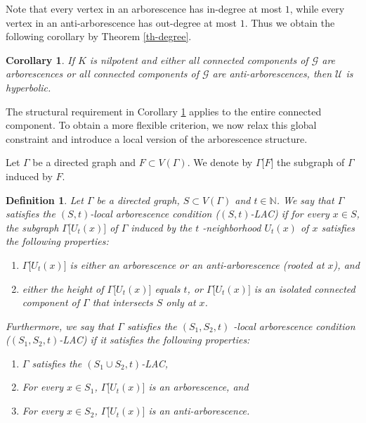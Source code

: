 \documentclass[reqno]{amsart}
\theoremstyle{plain}
\newtheorem{corollary}{Corollary}
\newtheorem{definition}{Definition}
\numberwithin{equation}{section}
\begin{document}
Note that every vertex in an arborescence has in-degree at most $1$, while
every vertex in an anti-arborescence has out-degree at most $1$. Thus we
obtain the following corollary by Theorem \ref{th-degree}.

\begin{corollary}
\label{cor-arbo}If $K$ is nilpotent and either all connected components of $%
\mathcal{G}$ are arborescences or all connected components of $\mathcal{G}$
are anti-arborescences, then $\mathcal{U}$ is hyperbolic.
\end{corollary}

The structural requirement in Corollary \ref{cor-arbo} applies to the entire
connected component. To obtain a more flexible criterion, we now relax this
global constraint and introduce a local version of the arborescence
structure.

Let $\Gamma $ be a directed graph and $F\subset V(\Gamma ).$ We denote by $%
\Gamma \lbrack F]$ the subgraph of $\Gamma $ induced by $F$.

\begin{definition}
\label{LAC}Let $\Gamma $ be a directed graph, $S\subset V(\Gamma )$ and $%
t\in \mathbb{N}$. We say that $\Gamma $ satisfies the $(S,t)$\emph{-local
arborescence condition (}$(S,t)$-LAC\emph{)} if for every $x\in S$, the
subgraph $\Gamma \lbrack U_{t}(x)]$ of $\Gamma $ induced by the $t$%
-neighborhood $U_{t}(x)$ of $x$ satisfies the following properties:

\begin{enumerate}
\item[(i)] $\Gamma \lbrack U_{t}(x)]$ is either an arborescence or an
anti-arborescence (rooted at $x$), and

\item[(ii)] either the height of $\Gamma \lbrack U_{t}(x)]$ equals $t$, or $%
\Gamma \lbrack U_{t}(x)]$ is an isolated connected component of $\Gamma $
that intersects $S$ only at $x$.
\end{enumerate}

Furthermore, we say that $\Gamma $ satisfies the $(S_{1},S_{2},t)$\emph{%
-local arborescence condition }($(S_{1},S_{2},t)$-LAC) if it satisfies the
following properties:

\begin{enumerate}
\item[(i)] $\Gamma $ satisfies the $(S_{1}\cup S_{2},t)$-LAC,

\item[(ii)] For every $x\in S_{1}$, $\Gamma \lbrack U_{t}(x)]$ is an
arborescence, and

\item[(iii)] For every $x\in S_{2}$, $\Gamma \lbrack U_{t}(x)]$ is an
anti-arborescence.
\end{enumerate}
\end{definition}
\end{document}
